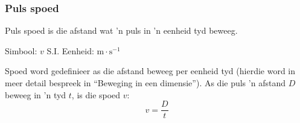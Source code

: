 \subsubsection*{Puls spoed}
            \nopagebreak
\par
            { \label{m38801*meaningfhsst!!!underscore!!!id145}
        \label{m38801*id313292}Puls spoed is die afstand wat 'n puls in 'n eenheid tyd beweeg. \par 
	    Simbool: $v$ \hspace{2cm} S.I. Eenheid: $\text{m}\cdot \text{s}^{-1}$
         } 
        
Spoed word gedefinieer as die afstand beweeg per eenheid tyd (hierdie word in meer detail bespreek in ``Beweging in een dimensie''). As die puls 'n afstand $D$ beweeg in 'n tyd $t$, is die spoed $v$:
        \label{m38801*uid4}\nopagebreak\noindent{}
    \begin{equation}
    \boxed{v=\frac{D}{t}}\nonumber
      \end{equation}
\par
            \label{m38801*secfhsst!!!underscore!!!id161}\vspace{.5cm} 
      \noindent



